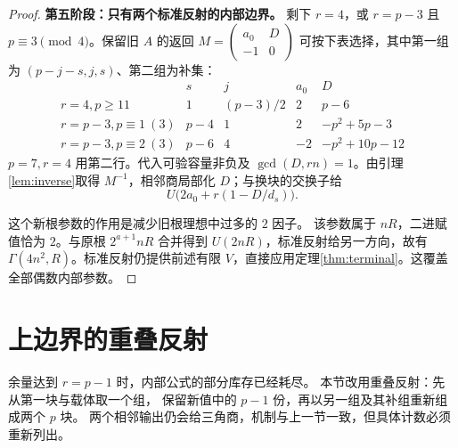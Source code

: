 \begin{proof}
\par\noindent\textbf{第五阶段：只有两个标准反射的内部边界。}
剩下 $r=4$，或 $r=p-3$ 且 $p\equiv3\pmod4$。保留旧 $A$ 的返回 $M=\left(\begin{smallmatrix}a_0&D\\-1&0\end{smallmatrix}\right)$ 可按下表选择，其中第一组为 $(p-j-s,j,s)$、第二组为补集：
\[
\begin{array}{c|rrrr}
&s&j&a_0&D\\\hline
r=4,p\ge11&1&(p-3)/2&2&p-6\\
r=p-3,p\equiv1\ (3)&p-4&1&2&-p^2+5p-3\\
r=p-3,p\equiv2\ (3)&p-6&4&-2&-p^2+10p-12
\end{array}
\]
$p=7,r=4$ 用第二行。代入可验容量非负及 $\gcd(D,rn)=1$。由引理\ref{lem:inverse}取得 $M^{-1}$，相邻商局部化 $D$；与换块的交换子给
\[U\bigl(2a_0+r(1-D/d_s)\bigr).
\]

这个新根参数的作用是减少旧根理想中过多的 $2$ 因子。
该参数属于 $nR$，二进赋值恰为 $2$。与原根 $2^{a+1}nR$ 合并得到 $U(2nR)$，标准反射给另一方向，故有 $\Gamma(4n^2,R)$。标准反射仍提供前述有限 $V$，直接应用定理\ref{thm:terminal}。这覆盖全部偶数内部参数。
\end{proof}


\section{上边界的重叠反射}
余量达到 $r=p-1$ 时，内部公式的部分库存已经耗尽。
本节改用重叠反射：先从第一块与载体取一个组，
保留新值中的 $p-1$ 份，再以另一组及其补组重新组成两个 $p$ 块。
两个相邻输出仍会给三角商，机制与上一节一致，但具体计数必须重新列出。

